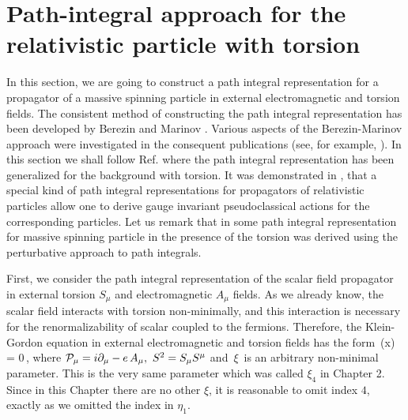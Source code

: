 \section{Path-integral approach for the relativistic particle
   with torsion}

In this section, we are going to construct a path integral
representation for a propagator of a massive spinning particle
in external electromagnetic and torsion fields. 
The consistent method of constructing the path integral
representation has been developed by Berezin and Marinov
\cite{BerMa75}. Various aspects of the
Berezin-Marinov approach were investigated in the consequent
publications (see, for example, \cite{Casal76}). In this
section we shall follow Ref. \cite{gegi} where the path 
integral representation has been generalized for the background
with torsion. It was demonstrated in \cite{FraGi91,Gitma97},
that a special kind of path integral representations for
propagators of  relativistic particles  allow one
to derive gauge invariant pseudoclassical actions
for the corresponding particles. 
Let us remark that in \cite{FraSh92} some path integral 
representation for massive spinning particle in the presence
of the torsion was derived using the perturbative approach to
path integrals.

First, we consider the path integral representation of the 
 scalar field  propagator in external torsion $S_\mu$ and
electromagnetic $A_\mu$ fields. As we already know, the scalar
field interacts with torsion non-minimally, and this interaction is
necessary for the renormalizability of scalar coupled to the 
fermions. Therefore,  the Klein-Gordon equation in
external electromagnetic and torsion fields has the form
\beq
{}\,\ph(x) = 0\,,
\label{scal}
\eeq
where ${\cal P}_\mu = i\partial_\mu - e\,A_\mu,\,\,S^2=S_\mu S^\mu$
and $\,\xi\,$ is an arbitrary non-minimal parameter.
This is the
very same parameter which was called $\xi_4$ in Chapter 2.
Since in this Chapter there are no other $\xi$, it is reasonable
to omit index $4$, exactly as we omitted the index in $\eta_1$.


